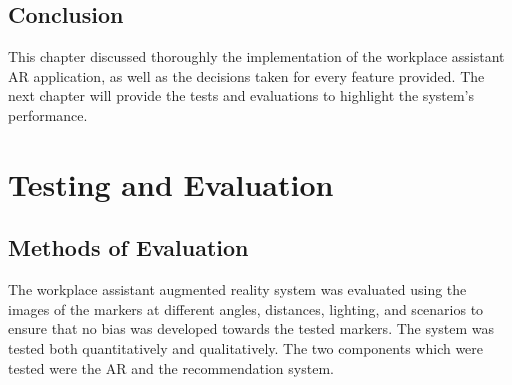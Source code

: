 \documentclass{aifyp}
\begin{document}
\subsection{Conclusion}
This chapter discussed thoroughly the implementation of the workplace assistant AR application, as well as the decisions taken for every feature provided. The next chapter will provide the tests and evaluations to highlight the system’s performance.

\newpage
\section{Testing and Evaluation}
\subsection{Methods of Evaluation}
The workplace assistant augmented reality system was evaluated using the images of the markers at different angles, distances, lighting, and scenarios to ensure that no bias was developed towards the tested markers. The system was tested both quantitatively and qualitatively. The two components which were tested were the AR and the recommendation system.
\end{document}
